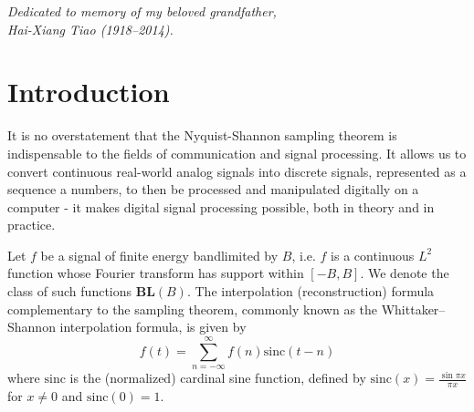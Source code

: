 \documentclass[11pt,oneside]{book}
\theoremstyle{plain}
\theoremstyle{definition}
\theoremstyle{remark}
\begin{document}
\newpage 

\thispagestyle{plain}

\begin{center}
{\large
  \emph{Dedicated to memory of my beloved grandfather, \\ 
  Hai-Xiang Tiao (1918--2014).}
}  
\end{center}


\newpage


\tableofcontents %

\newpage


\chapter{Introduction} \label{intro} %

It is no overstatement that the Nyquist-Shannon sampling theorem
 is indispensable to the fields of communication and signal processing. It 
allows us to convert continuous real-world analog signals into discrete signals, 
represented as a sequence a numbers, to then be processed and manipulated digitally on a 
computer - it makes digital signal processing possible, both in theory and in practice.

Let $f$ be a signal of finite energy bandlimited by $B$, i.e. $f$ is a continuous $L^2$ 
function whose Fourier transform has support within $[-B,B]$. We denote the class of
such functions $\mathbf{BL}(B)$. The interpolation (reconstruction) formula complementary to the 
sampling theorem, commonly known as the Whittaker–Shannon interpolation formula, is
given by
\begin{equation} \label{eq:whittaker_shannon}
  f(t) = \sum_{n=-\infty}^{\infty} f(n) \mathrm{sinc}(t-n)
\end{equation}
where $\mathrm{sinc}$ is the (normalized) cardinal sine function, defined by 
$\mathrm{sinc}(x)=\frac{\sin{\pi x}}{\pi x}$ for $x \neq 0$ and $\mathrm{sinc}(0)=1$.
\end{document}

